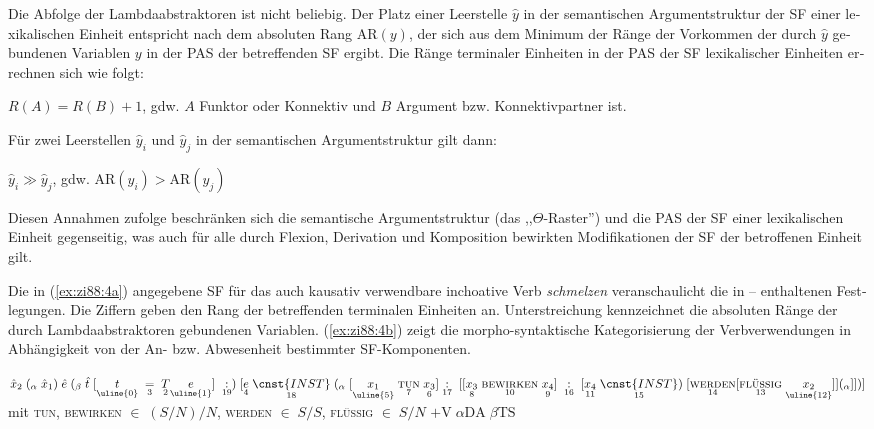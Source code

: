 \documentclass[output=paper,colorlinks,citecolor=brown, booklanguage=german]{langscibook}
\begin{document}
\begin{otherlanguage}{german}
Die Abfolge der Lambdaabstraktoren ist nicht beliebig. Der Platz einer Leerstelle $\hat{y}$ in der semantischen Argumentstruktur der SF einer lexikalischen Einheit entspricht nach \citet{Bierwisch1987b,Bierwisch1987c} dem absoluten Rang $\text{AR}(y)$, der sich aus dem Minimum der Ränge der Vorkommen der durch $\hat{y}$ gebundenen Variablen $y$ in der PAS der betreffenden SF ergibt. Die Ränge terminaler Einheiten in der PAS der SF lexikalischer Einheiten errechnen sich wie folgt:

\ea\label{ex:zi88:2} $R(A) = R(B) + 1$, gdw. $A$ Funktor oder Konnektiv und $B$ Argument bzw. Konnektivpartner ist.
\z 

\noindent Für zwei Leerstellen $\hat{y}_i$ und $\hat{y}_j$ in der semantischen Argumentstruktur gilt dann:

\ea\label{ex:zi88:3} $\hat{y}_i \gg \hat{y}_j$, gdw. $\text{AR}(y_i) > \text{AR}(y_j)$
\z 

\noindent Diesen Annahmen zufolge beschränken sich die semantische Argumentstruktur (das ,,$\Theta$-Raster'') und die PAS der SF einer lexikalischen Einheit gegenseitig, was auch für alle durch Flexion, Derivation und Komposition bewirkten Modifikationen der SF der betroffenen Einheit gilt. 

Die in (\ref{ex:zi88:4a}) angegebene SF für das auch kausativ verwendbare inchoative Verb \textit{schmelzen} veranschaulicht die in -- enthaltenen Festlegungen. Die Ziffern geben den Rang der betreffenden terminalen Einheiten an. Un\-ter\-strei\-chung kennzeichnet die absoluten Ränge der durch Lambdaabstraktoren gebundenen Variablen. (\ref{ex:zi88:4b}) zeigt die morpho-syntaktische Kategorisierung der Verbverwendungen in Abhängigkeit von der An- bzw. Abwesenheit bestimmter SF-Komponenten.

\ea\label{ex:zi88:4}
    \ea\label{ex:zi88:4a} $\hat{x}_2 \; (_\alpha \; \hat{x}_1) \; \hat{e} \; (_\beta \; \hat{t} \; [\underset{\uline{0}}{t} \; \underset{3}{=} \; \underset{2}{T} \underset{\uline{1}}{e}] \; \underset{19}{:}) \; [\underset{4}{e} \; \underset{18}{\cnst{INST}} \; (_\alpha \; [\underset{\uline{5}}{x_1} \; \underset{7}{\textsc{tun}} \; \underset{6}{x_3}] \newline \underset{17}{:} \; [[\underset{8}{x_3} \; \underset{10}{\textsc{bewirken}} \; \underset{9}{x_4}] \; \underset{16}{:} \; [\underset{11}{x_4} \; \underset{15}{\cnst{INST}}) \; [\underset{14}{\textsc{werden}} \newline [\underset{13}{\textsc{flüssig}} \; \underset{\uline{12}}{x_2}]](_\alpha]])]$ \newline mit \textsc{tun}, \textsc{bewirken} $\in \; (S/N)/N$, \textsc{werden} $\in \; S/S$, \newline \textsc{flüssig} $\in \; S/N$
    \ex\label{ex:zi88:4b} $+\text{V} \; \alpha \text{DA} \; \beta \text{TS}$
\z\z


\end{otherlanguage}
\end{document}
